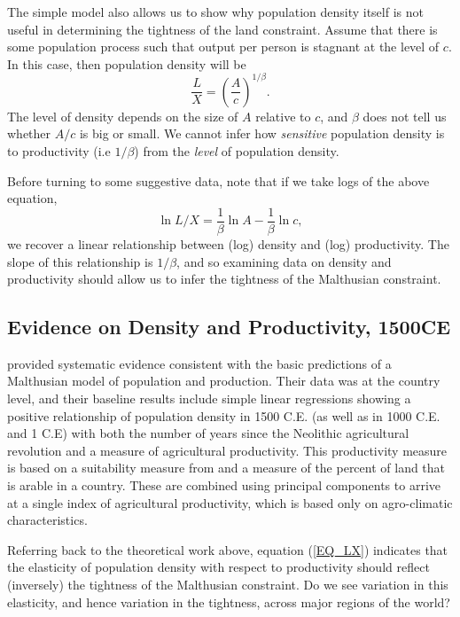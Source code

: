 \documentclass[11pt]{article}
\begin{document}
The simple model also allows us to show why population density itself is not useful in determining the tightness of the land constraint. Assume that there is some population process such that output per person is stagnant at the level of $c$. In this case, then population density will be
\begin{equation}
    \frac{L}{X} = \left(\frac{A}{c}\right)^{1/\beta}.
\end{equation}
The level of density depends on the size of $A$ relative to $c$, and $\beta$ does not tell us whether $A/c$ is big or small. We cannot infer how \textit{sensitive} population density is to productivity (i.e $1/\beta$) from the \textit{level} of population density. 

Before turning to some suggestive data, note that if we take logs of the above equation,
\begin{equation}
	\ln L/X = \frac{1}{\beta} \ln A - \frac{1}{\beta} \ln c, \label{EQ_LX}
\end{equation}
we recover a linear relationship between (log) density and (log) productivity. The slope of this relationship is $1/\beta$, and so examining data on density and productivity should allow us to infer the tightness of the Malthusian constraint.

\subsection{Evidence on Density and Productivity, 1500CE}
\citet{ashraf2010dynamics} provided systematic evidence consistent with the basic predictions of a Malthusian model of population and production. Their data was at the country level, and their baseline results include simple linear regressions showing a positive relationship of population density in 1500 C.E. (as well as in 1000 C.E. and 1 C.E) with both the number of years since the Neolithic agricultural revolution and a measure of agricultural productivity. This productivity measure is based on a suitability measure from \citet{ramankutty2002} and a measure of the percent of land that is arable in a country. These are combined using principal components to arrive at a single index of agricultural productivity, which is based only on agro-climatic characteristics.

Referring back to the theoretical work above, equation (\ref{EQ_LX}) indicates that the elasticity of population density with respect to productivity should reflect (inversely) the tightness of the Malthusian constraint. Do we see variation in this elasticity, and hence variation in the tightness, across major regions of the world?
\end{document}
